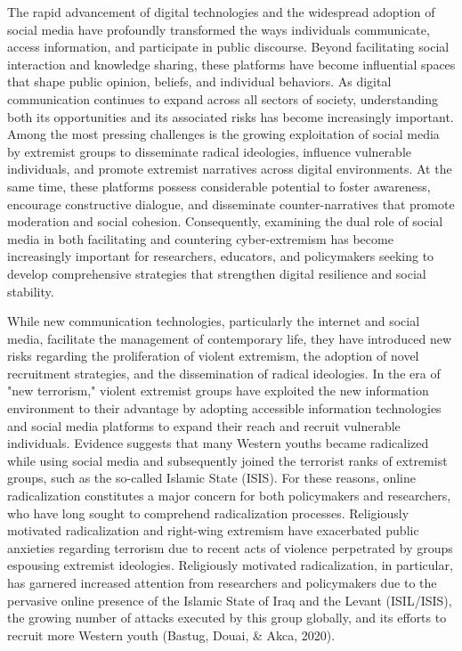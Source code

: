 \documentclass[10pt]{NSP1}
\begin{document}
The rapid advancement of digital technologies and the widespread adoption of social media have profoundly transformed the ways individuals communicate, access information, and participate in public discourse. Beyond facilitating social interaction and knowledge sharing, these platforms have become influential spaces that shape public opinion, beliefs, and individual behaviors. As digital communication continues to expand across all sectors of society, understanding both its opportunities and its associated risks has become increasingly important. Among the most pressing challenges is the growing exploitation of social media by extremist groups to disseminate radical ideologies, influence vulnerable individuals, and promote extremist narratives across digital environments. At the same time, these platforms possess considerable potential to foster awareness, encourage constructive dialogue, and disseminate counter-narratives that promote moderation and social cohesion. Consequently, examining the dual role of social media in both facilitating and countering cyber-extremism has become increasingly important for researchers, educators, and policymakers seeking to develop comprehensive strategies that strengthen digital resilience and social stability.

While new communication technologies, particularly the internet and social media, facilitate the management of contemporary life, they have introduced new risks regarding the proliferation of violent extremism, the adoption of novel recruitment strategies, and the dissemination of radical ideologies. In the era of "new terrorism," violent extremist groups have exploited the new information environment to their advantage by adopting accessible information technologies and social media platforms to expand their reach and recruit vulnerable individuals. Evidence suggests that many Western youths became radicalized while using social media and subsequently joined the terrorist ranks of extremist groups, such as the so-called Islamic State (ISIS). For these reasons, online radicalization constitutes a major concern for both policymakers and researchers, who have long sought to comprehend radicalization processes. Religiously motivated radicalization and right-wing extremism have exacerbated public anxieties regarding terrorism due to recent acts of violence perpetrated by groups espousing extremist ideologies. Religiously motivated radicalization, in particular, has garnered increased attention from researchers and policymakers due to the pervasive online presence of the Islamic State of Iraq and the Levant (ISIL/ISIS), the growing number of attacks executed by this group globally, and its efforts to recruit more Western youth (Bastug, Douai, \& Akca, 2020).
\end{document}

